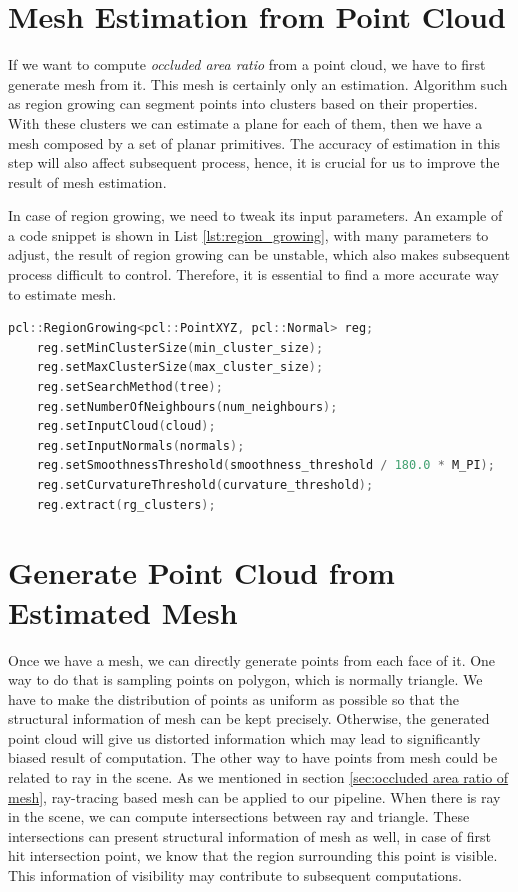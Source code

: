 \documentclass[11pt, a4paper,oneside,chapterprefix=false]{scrbook}
\begin{document}
\section{Mesh Estimation from Point Cloud} \label{mesh estimation of point cloud}

If we want to compute \emph{occluded area ratio} from a point cloud, we have to first generate mesh from it. This mesh is certainly only an estimation. Algorithm such as region growing \cite{pcl_tutorial_2023_rg} can segment points into clusters based on their properties. With these clusters we can estimate a plane for each of them, then we have a mesh composed by a set of planar primitives. The accuracy of estimation in this step will also affect subsequent process, hence, it is crucial for us to improve the result of mesh estimation. 

\vspace{10pt}

In case of region growing, we need to tweak its input parameters. An example of a code snippet is shown in List \ref{lst:region_growing}, with many parameters to adjust, the result of region growing can be unstable, which also makes subsequent process difficult to control. Therefore, it is essential to find a more accurate way to estimate mesh.   
\begin{lstlisting}[language=C++, caption=Region Growing, label=lst:region_growing]
    pcl::RegionGrowing<pcl::PointXYZ, pcl::Normal> reg;
    reg.setMinClusterSize(min_cluster_size);
    reg.setMaxClusterSize(max_cluster_size);
    reg.setSearchMethod(tree);
    reg.setNumberOfNeighbours(num_neighbours);
    reg.setInputCloud(cloud);
    reg.setInputNormals(normals);
    reg.setSmoothnessThreshold(smoothness_threshold / 180.0 * M_PI);
    reg.setCurvatureThreshold(curvature_threshold);
    reg.extract(rg_clusters);
\end{lstlisting}

\section{Generate Point Cloud from Estimated Mesh} \label{generate point cloud from estimated mesh}

Once we have a mesh, we can directly generate points from each face of it. One way to do that is sampling points on polygon, which is normally triangle. We have to make the distribution of points as uniform as possible so that the structural information of mesh can be kept precisely. Otherwise, the generated point cloud will give us distorted information which may lead to significantly biased result of computation. The other way to have points from mesh could be related to ray in the scene. As we mentioned in section \ref{sec:occluded area ratio of mesh}, ray-tracing based mesh can be applied to our pipeline. When there is ray in the scene, we can compute intersections between ray and triangle. These intersections can present structural information of mesh as well, in case of first hit intersection point, we know that the region surrounding this point is visible. This information of visibility may contribute to subsequent computations. 
\end{document}

